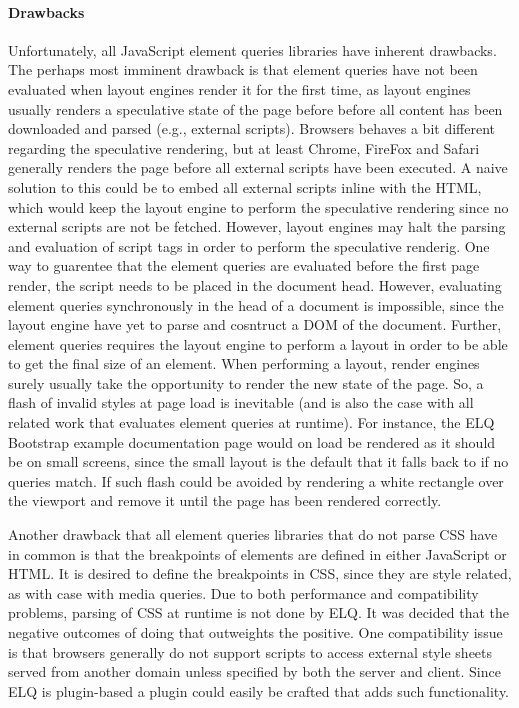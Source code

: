 \documentclass[a4paper,11pt]{kth-mag}
\begin{document}
    \paragraph{Drawbacks}
    Unfortunately, all JavaScript element queries libraries have inherent drawbacks.
    The perhaps most imminent drawback is that element queries have not been evaluated when layout engines render it for the first time, as layout engines usually renders a speculative state of the page before before all content has been downloaded and parsed (e.g., external scripts).
    Browsers behaves a bit different regarding the speculative rendering, but at least Chrome, FireFox and Safari generally renders the page before all external scripts have been executed.
    A naive solution to this could be to embed all external scripts inline with the \gls{HTML}, which would keep the layout engine to perform the speculative rendering since no external scripts are not be fetched.
    However, layout engines may halt the parsing and evaluation of script tags in order to perform the speculative renderig.
    One way to guarentee that the element queries are evaluated before the first page render, the script needs to be placed in the document head.
    However, evaluating element queries synchronously in the head of a document is impossible, since the layout engine have yet to parse and cosntruct a \gls{DOM} of the document.
    Further, element queries requires the layout engine to perform a layout in order to be able to get the final size of an element.
    When performing a layout, render engines surely usually take the opportunity to render the new state of the page.
    So, a flash of invalid styles at page load is inevitable (and is also the case with all related work that evaluates element queries at runtime).
    For instance, the \gls{ELQ} Bootstrap example documentation page would on load be rendered as it should be on small screens, since the small layout is the default that it falls back to if no queries match.
    If such flash could be avoided by rendering a white rectangle over the viewport and remove it until the page has been rendered correctly.

    Another drawback that all element queries libraries that do not parse \gls{CSS} have in common is that the breakpoints of elements are defined in either \gls{JavaScript} or \gls{HTML}.
    It is desired to define the breakpoints in \gls{CSS}, since they are style related, as with case with media queries.
    Due to both performance and compatibility problems, parsing of \gls{CSS} at runtime is not done by \gls{ELQ}.
    It was decided that the negative outcomes of doing that outweights the positive.
    One compatibility issue is that browsers generally do not support scripts to access external style sheets served from another domain unless specified by both the server and client.
    Since \gls{ELQ} is plugin-based a plugin could easily be crafted that adds such functionality.
\end{document}
